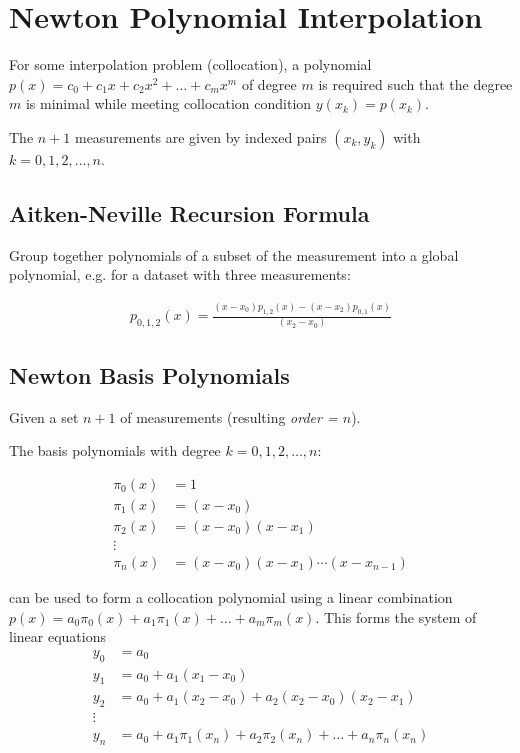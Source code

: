 \section{Newton Polynomial Interpolation}

For some interpolation problem (collocation), a polynomial
$p(x) = c_0 + c_1x + c_2x^2 + \ldots + c_mx^m$
of degree $m$ is required such that the degree $m$ is minimal while meeting collocation condition $y(x_k)=p(x_k)$.

The $n+1$ measurements are given by indexed pairs $(x_k,y_k)$ with $k=0,1,2,\ldots,n$.

\subsection{Aitken-Neville Recursion Formula}

Group together polynomials of a subset of the measurement into a global polynomial, e.g. for a dataset with three measurements:

\begin{align*}
    p_{0,1,2}(x)=\frac{(x-x_0)p_{1,2}(x) - (x-x_2)p_{0,1}(x)}{(x_2-x_0)}
\end{align*}

\subsection{Newton Basis Polynomials}
Given a set $n+1$ of measurements (resulting \emph{order = $n$}).

The basis polynomials with degree $k=0,1,2,\ldots,n$:

\begin{snugshade*}
    \begin{align*}
        \pi_0(x) & = 1 \\
        \pi_1(x) & = (x-x_0) \\
        \pi_2(x) & = (x-x_0)(x-x_1) \\
        \vdots \\
        \pi_n(x) & = (x-x_0)(x-x_1)\cdots(x-x_{n-1})
    \end{align*}
\end{snugshade*}

can be used to form a collocation polynomial using a linear combination
$p(x)=a_0\pi_0(x) + a_1\pi_1(x) + \ldots + a_m\pi_m(x)$.
This forms the system of linear equations
\begin{align*}
    y_0 & = a_0 \\
    y_1 & = a_0 + a_1(x_1-x_0) \\
    y_2 & = a_0 + a_1(x_2-x_0) + a_2(x_2-x_0)(x_2-x_1) \\
    \vdots \\
    y_n & = a_0+a_1\pi_1(x_n)+a_2\pi_2(x_n)+\ldots+a_n\pi_n(x_n)
\end{align*}

